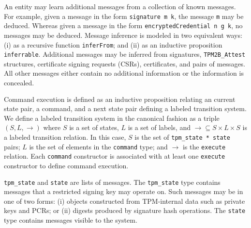 \documentclass[runningheads]{llncs}
\begin{document}
An entity may learn additional messages from a collection of known
messages. For example, given a message in the form
\verb|signature m k|, the message \verb|m| may be deduced. Whereas
given a message in the form \verb|encryptedCredential n g k|, no
messages may be deduced. Message inference is modeled in two
equivalent ways: (i) as a recursive function \verb|inferFrom|; and
(ii) as an inductive proposition \verb|inferrable|.  Additional
messages may be inferred from signatures, \verb|TPM2B_Attest|
structures, certificate signing requests (CSRs), certificates, and
pairs of messages. All other messages either contain no additional
information or the information is concealed.

Command execution is defined as an inductive proposition relating an
current state pair, a command, and a next state pair defining a
labeled transition system. We define a labeled transition system in
the canonical fashion as a triple $(S,L,\rightarrow)$ where $S$ is a
set of states, $L$ is a set of labels, and
$\rightarrow \subseteq S \times L \times S$ is a labeled transition
relation. In this case, $S$ is the set of \verb|tpm_state * state|
pairs; $L$ is the set of elements in the \verb|command| type; and
$\rightarrow$ is the \verb|execute| relation.  Each \verb|command|
constructor is associated with at least one \verb|execute| constructor
to define command execution.


\verb|tpm_state| and \verb|state| are lists of messages. The
\verb|tpm_state| type contains messages that a restricted signing key
may operate on. Such messages may be in one of two forms: (i) objects
constructed from TPM-internal data such as private keys and PCRs; or
(ii) digests produced by signature hash operations.  The \verb|state|
type contains messages visible to the system.

\end{document}
